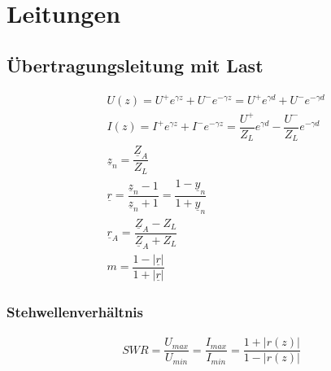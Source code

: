 \section{Leitungen}
\subsection{Übertragungsleitung mit Last}
\begin{align*}
    &U(z) = U^+ e^{\gamma z} + U^- e^{-\gamma z} = U^+ e^{\gamma d} + U^ - e^{-\gamma d} \\
    &I(z) = I^+ e^{\gamma z} + I^- e^{-\gamma z} = \dfrac{U^+}{Z_L}e^{\gamma d} - \dfrac{U^-}{Z_L}e^{-\gamma d}\\
    &\underline{z}_n = \dfrac{\underline{Z}_A}{Z_L}\\
    &\underline{r} = \dfrac{\underline{z}_n-1}{\underline{z}_n+1}= \dfrac{1-\underline{y}_n}{1+\underline{y}_n} \\
    &\underline{r}_A = \dfrac{\underline{Z}_A-Z_L}{\underline{Z}_A+Z_L}\\
    &m = \dfrac{1-|\underline{r}|}{1+|\underline{r}|}
\end{align*}
\subsubsection{Stehwellenverhältnis}
\begin{align*}
    SWR = \dfrac{U_{max}}{U_{min}} = \dfrac{I_{max}}{I_{min}} = \dfrac{1+|r(z)|}{1-|r(z)|}
\end{align*}